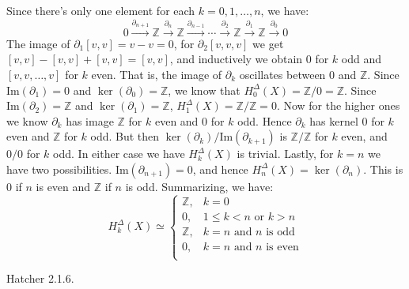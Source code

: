     \begin{solution}
        Since there's only one element for each $k=0,1,\dots,n$, we have:
        \begin{equation}
            0\overset{\partial_{n+1}}{\longrightarrow}\mathbb{Z}
            \overset{\partial_{n}}{\longrightarrow}\mathbb{Z}
            \overset{\partial_{n-1}}{\longrightarrow}
            \cdots
            \overset{\partial_{2}}{\longrightarrow}\mathbb{Z}
            \overset{\partial_{1}}{\longrightarrow}\mathbb{Z}
            \overset{\partial_{0}}{\longrightarrow}0
        \end{equation}
        The image of $\partial_{1}[v,v]=v-v=0$, for $\partial_{2}[v,v,v]$ we get
        $[v,v]-[v,v]+[v,v]=[v,v]$, and inductively we obtain $0$ for $k$ odd and
        $[v,v,\dots,v]$ for $k$ even. That is, the image of $\partial_{k}$
        oscillates between $0$ and $\mathbb{Z}$. Since $\textrm{Im}(\partial_{1})=0$
        and $\ker(\partial_{0})=\mathbb{Z}$, we know that
        $H_{0}^{\Delta}(X)=\mathbb{Z}/0=\mathbb{Z}$. Since
        $\textrm{Im}(\partial_{2})=\mathbb{Z}$ and $\ker(\partial_{1})=\mathbb{Z}$,
        $H_{1}^{\Delta}(X)=\mathbb{Z}/\mathbb{Z}=0$. Now for the higher ones we
        know $\partial_{k}$ has image $\mathbb{Z}$ for $k$ even and $0$ for $k$
        odd. Hence $\partial_{k}$ has kernel $0$ for $k$ even and $\mathbb{Z}$
        for $k$ odd. But then $\ker(\partial_{k})/\textrm{Im}(\partial_{k+1})$
        is $\mathbb{Z}/\mathbb{Z}$ for $k$ even, and $0/0$ for $k$ odd. In
        either case we have $H_{k}^{\Delta}(X)$ is trivial. Lastly, for $k=n$
        we have two possibilities.  $\textrm{Im}(\partial_{n+1})=0$, and hence
        $H_{n}^{\Delta}(X)=\ker(\partial_{n})$. This is $0$ if $n$ is even and
        $\mathbb{Z}$ if $n$ is odd. Summarizing, we have:
        \begin{equation}
            H_{k}^{\Delta}(X)\simeq
            \begin{cases}
                \mathbb{Z},&k=0\\
                0,&1\leq{k}<n\text{ or }k>n\\
                \mathbb{Z},&k=n\text{ and }n\text{ is odd}\\
                0,&k=n\text{ and }n\text{ is even}\\
            \end{cases}
        \end{equation}
    \end{solution}
    \begin{problem}
        Hatcher 2.1.6.
    \end{problem}
